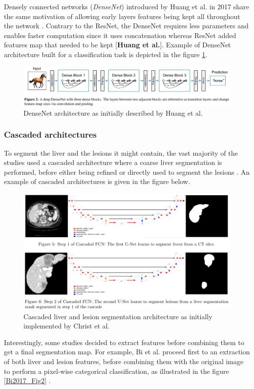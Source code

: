 \documentclass[]{article}
\begin{document}
Densely connected networks (\emph{DenseNet}) introduced by Huang
	et al. in 2017 share the same motivation of allowing early layers
features being kept all throughout the network \cite{Huang2017}. Contrary to the ResNet,
the DenseNet requires less parameters and enables faster computation
since it uses concatenation whereas ResNet added features map that
needed to be kept {[}\textbf{Huang et al.}{]}. Example of DenseNet
architecture built for a classification task is depicted in the figure \ref{DenseNet_Fig}.
\begin{figure}[th!]
	\centering
	\includegraphics[width=0.7\linewidth]{images/image32}
	\caption{DenseNet architecture as initially described by Huang et al. \cite{Huang2017}}
	\label{DenseNet_Fig}
\end{figure}


\subsubsection*{Cascaded architectures}

To segment the liver and the lesions it might contain, the vast majority
of the studies used a cascaded architecture where a coarse liver
segmentation is performed, before either being refined \cite{Yuan2017} or directly used to segment the lesions \cite{Han2017, Li2018, Kaluva2018, Ben-Cohen, Christ2017}. An example of cascaded architectures is
given in the figure below. 
\begin{figure}[th!]
	\centering
	\includegraphics[width=0.7\linewidth]{images/image35}
	\caption{Cascaded liver and lesion segmentation architecture as initially implemented by Christ et al. \cite{Christ2017}}
	\label{Cascade_Christ}
\end{figure}

Interestingly, some studies decided to extract features before combining
them to get a final segmentation map. For example, Bi et al.
proceed first to an extraction of both liver and lesion features, before
combining them with the original image to perform a pixel-wise
categorical classification, as illustrated in the figure \ref{Bi2017_Fig2} \cite{Bi2017}.
\end{document}
